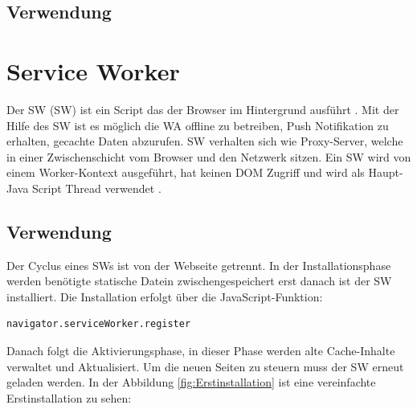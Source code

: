 \subsection{Verwendung}


\section{Service Worker}
Der \acl{SW} (\acs{SW}) ist ein Script das der Browser im Hintergrund ausführt \cite{lifecycleSW}. Mit der Hilfe des \acs{SW} ist es möglich die \acs{WA} offline zu betreiben, Push Notifikation zu erhalten, gecachte Daten abzurufen. \acs{SW} verhalten sich wie Proxy-Server, welche in einer Zwischenschicht vom Browser und den Netzwerk sitzen. 
Ein \acs{SW} wird von einem Worker-Kontext \cite{Worker} ausgeführt, hat keinen DOM Zugriff und wird als Haupt-Java Script Thread verwendet \cite{ServiceWorker}.

\subsection{Verwendung}
Der Cyclus eines \acs{SW}s ist von der Webseite getrennt.
In der Installationsphase werden benötigte statische Datein zwischengespeichert erst danach ist der \acs{SW} installiert. Die Installation erfolgt über die JavaScript-Funktion:

\begin{lstlisting}[caption={Service Worker Register},label=lst:ServiceWorkerRegister, xleftmargin=50pt]
navigator.serviceWorker.register
\end{lstlisting}  
Danach folgt die Aktivierungsphase, in dieser Phase werden alte Cache-Inhalte verwaltet und Aktualisiert.
Um die neuen Seiten zu steuern muss der \acs{SW} erneut geladen werden.
In der Abbildung \ref{fig:Erstinstallation} ist eine vereinfachte Erstinstallation zu sehen:


